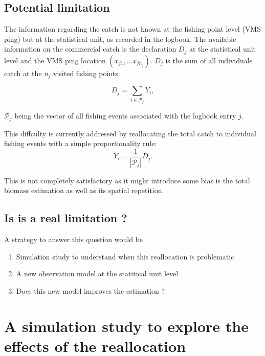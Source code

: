 \documentclass[
]{book}
\providecommand{\tightlist}{%
  \setlength{\itemsep}{0pt}\setlength{\parskip}{0pt}}
\begin{document}
\hypertarget{potential-limitation}{%
\section{Potential limitation}\label{potential-limitation}}

The information regarding the catch is not known at the fishing point level (VMS ping) but at the statistical unit, as recorded in the logbook.
The available information on the commercial catch is the declaration \(D_j\) at the statistical unit level and the VMS ping location \((x_{j1}, \ldots x_{jn_j})\). \(D_j\) is the sum of all individuals catch at the \(n_j\) visited fishing points:

\begin{equation*}
  D_{j} = \sum_{i \in  \mathcal{P}_j} Y_i,
\end{equation*}

\(\mathcal{P}_j\) being the vector of all fishing events associated with the logbook entry \(j\).

This diffculty is currently addressed by reallocating the total catch to individual fishing events with a simple proportionality rule:
\[\tilde{Y_i} = \frac{1}{|\mathcal{P}_j|} D_j.\]

This is not completely satisfactory as it might introduce some bias is the total biomass estimation as well as its spatial repetition.

\hypertarget{is-is-a-real-limitation}{%
\section{Is is a real limitation ?}\label{is-is-a-real-limitation}}

A strategy to answer this question would be

\begin{enumerate}
\def\labelenumi{\arabic{enumi}.}
\tightlist
\item
  Simulation study to understand when this reallocation is problematic
\item
  A new observation model at the statitical unit level
\item
  Does this new model improves the estimation ?
\end{enumerate}

\hypertarget{effects}{%
\chapter{A simulation study to explore the effects of the reallocation}\label{effects}}
\end{document}
